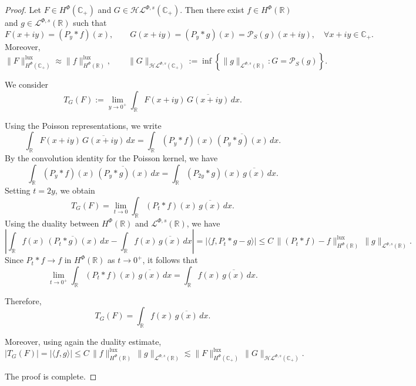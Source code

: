 \documentclass[a4paper,12pt,intlimits,oneside]{amsart}
\theoremstyle{definition}
\numberwithin{equation}{section}
\theoremstyle{definition}
\begin{document}
\begin{proof}
Let $F \in H^{\Phi}(\mathbb{C}_{+})$ and $G \in \mathcal{H}\mathcal{L}^{\Phi,s}(\mathbb{C}_{+})$. 
Then there exist $f \in H^{\Phi}(\mathbb{R})$ and $g \in \mathcal{L}^{\Phi,s}(\mathbb{R})$ such that
\[
F(x+iy) = (P_y * f)(x), \qquad G(x+iy) = (P_y * g)(x) = \mathcal{P}_S(g)(x+iy),
\quad \forall x+iy \in \mathbb{C}_{+}.
\]
Moreover,
\[  \|F\|_{H^{\Phi}(\mathbb{C}_{+})}^{\mathrm{lux}} \approx \|f\|_{H^{\Phi}(\mathbb{R})}^{\mathrm{lux}},
 \qquad
\|G\|_{\mathcal{H}\mathcal{L}^{\Phi,s}(\mathbb{C}_{+})}
:= \inf \left\{ \|g\|_{\mathcal{L}^{\Phi,s}(\mathbb{R})} : G = \mathcal{P}_S(g) \right\}.
\]

We consider
\[
T_G(F) := \lim_{y \to 0^{+}} \int_{\mathbb{R}} F(x+iy)\,\overline{G(x+iy)}\,dx.
\]

Using the Poisson representations, we write
\[
\int_{\mathbb{R}} F(x+iy)\,\overline{G(x+iy)}\,dx
= \int_{\mathbb{R}} (P_y * f)(x)\, \overline{(P_y * g)(x)}\, dx.
\]
By the convolution identity for the Poisson kernel, we have
\[
\int_{\mathbb{R}} (P_y * f)(x)\, \overline{(P_y * g)(x)}\, dx
= \int_{\mathbb{R}} (P_{2y} * g)(x)\, \overline{g(x)}\, dx.
\]
Setting $t = 2y$, we obtain
\[
T_G(F)
= \lim_{t \to 0} \int_{\mathbb{R}} (P_t * f)(x)\, \overline{g(x)}\, dx.
\]
Using the duality between $H^{\Phi}(\mathbb{R})$ and $\mathcal{L}^{\Phi,s}(\mathbb{R})$, we have
\[
\left| \int_{\mathbb{R}} f(x)\, \overline{(P_t * g)(x)}\, dx
- \int_{\mathbb{R}} f(x)\, \overline{g(x)}\, dx \right|
= |\langle f, P_t * g - g \rangle|
\le C \, \|(P_t * f)-f\|_{H^{\Phi}(\mathbb{R})}^{\mathrm{lux}} \, \|g\|_{\mathcal{L}^{\Phi,s}(\mathbb{R})}.
\]
Since $P_t * f \to f$ in $H^{\Phi}(\mathbb{R})$ as $t \to 0^{+}$, it follows that
\[
\lim_{t \to 0^{+}} \int_{\mathbb{R}} (P_t * f)(x)\, \overline{g(x)}\, dx
= \int_{\mathbb{R}} f(x)\, \overline{g(x)}\, dx.
\]

Therefore,
\[
T_G(F) = \int_{\mathbb{R}} f(x)\, \overline{g(x)}\, dx.
\]

Moreover, using again the duality estimate,
\[
|T_G(F)| = |\langle f, g \rangle|
\le C \, \|f\|_{H^{\Phi}(\mathbb{R})}^{\mathrm{lux}} \, \|g\|_{\mathcal{L}^{\Phi,s}(\mathbb{R})}
\lesssim \|F\|_{H^{\Phi}(\mathbb{C}_{+})}^{\mathrm{lux}} \, \|G\|_{\mathcal{H}\mathcal{L}^{\Phi,s}(\mathbb{C}_{+})}.
\]

The proof is complete.
\end{proof}
\end{document}
